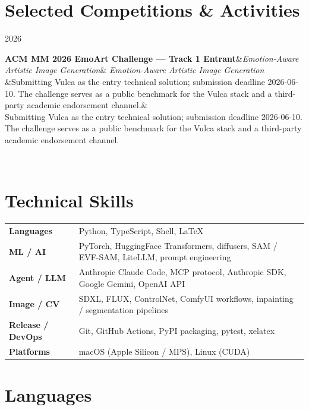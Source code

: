 \documentclass[10.5pt,a4paper]{article}
\newcommand{\cventry}[4]{%
  \noindent\begin{minipage}[t]{0.18\linewidth}\color{muted}\small #1\end{minipage}%
  \begin{minipage}[t]{0.80\linewidth}%
    \textbf{#2}\ifx&#3&\else{} \textperiodcentered{} {\color{muted}#3}\fi%
    \ifx&#4&\else\\[2pt]\small #4\fi%
  \end{minipage}\\[6pt]%
}
\begin{document}
\section*{Selected Competitions \& Activities}

\cventry{2026}
  {ACM MM 2026 EmoArt Challenge — Track 1 Entrant}
  {\emph{Emotion-Aware Artistic Image Generation}}
  {Submitting Vulca as the entry technical solution; submission deadline 2026-06-10.
  The challenge serves as a public benchmark for the Vulca stack and a third-party academic
  endorsement channel.}

\section*{Technical Skills}

\begin{center}
\begin{tabular}{@{}p{3.6cm}p{13cm}@{}}
\textbf{Languages}        & Python, TypeScript, Shell, \LaTeX{} \\
\textbf{ML / AI}          & PyTorch, HuggingFace Transformers, diffusers, SAM / EVF-SAM, LiteLLM, prompt engineering \\
\textbf{Agent / LLM}      & Anthropic Claude Code, MCP protocol, Anthropic SDK, Google Gemini, OpenAI API \\
\textbf{Image / CV}       & SDXL, FLUX, ControlNet, ComfyUI workflows, inpainting / segmentation pipelines \\
\textbf{Release / DevOps} & Git, GitHub Actions, PyPI packaging, pytest, xelatex \\
\textbf{Platforms}        & macOS (Apple Silicon / MPS), Linux (CUDA) \\
\end{tabular}
\end{center}

\section*{Languages}
\end{document}
